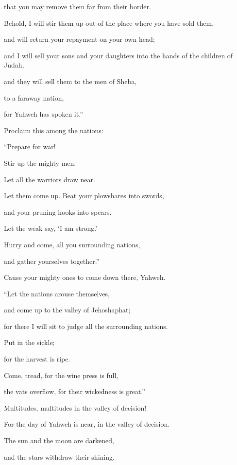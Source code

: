 {\par }{\QB that you may remove them far from their border.
\par }{\Q {}Behold, I will stir them up out of the place where you have sold them,
\par }{\QB and will return your repayment on your own head;
\par }{\Q {}and I will sell your sons and your daughters into the hands of the children of Judah,
\par }{\QB and they will sell them to the men of Sheba,
\par }{\QB to a faraway nation,
\par }{\QB for Yahweh has spoken it.”
\par }{\BB \par }{\Q {}Proclaim this among the nations:
\par }{\QB “Prepare for war!
\par }{\QB Stir up the mighty men.
\par }{\Q Let all the warriors draw near.
\par }{\QB Let them come up.
Beat your plowshares into swords,
\par }{\QB and your pruning hooks into spears.
\par }{\QB Let the weak say, ‘I am strong.’
\par }{\Q {}Hurry and come, all you surrounding nations,
\par }{\QB and gather yourselves together.”
\par }{\Q Cause your mighty ones to come down there, Yahweh.
\par }{\Q {}“Let the nations arouse themselves,
\par }{\QB and come up to the valley of Jehoshaphat;
\par }{\QB for there I will sit to judge all the surrounding nations.
\par }{\Q {}Put in the sickle;
\par }{\QB for the harvest is ripe.
\par }{\QB Come, tread, for the wine press is full,
\par }{\QB the vats overflow, for their wickedness is great.”
\par }{\Q {}Multitudes, multitudes in the valley of decision!
\par }{\QB For the day of Yahweh is near, in the valley of decision.
\par }{\Q {}The sun and the moon are darkened,
\par }{\QB and the stars withdraw their shining.
}
